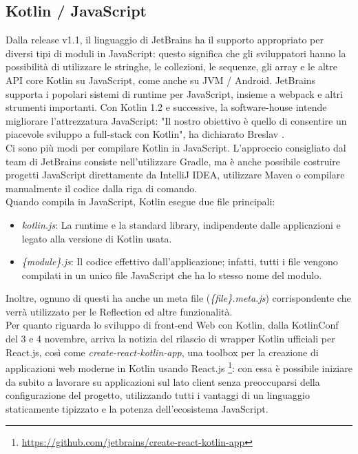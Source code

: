 \subsection{Kotlin / JavaScript}
Dalla release v1.1, il linguaggio di JetBrains ha il supporto appropriato per diversi tipi di moduli in JavaScript: questo significa che gli sviluppatori hanno la possibilità di utilizzare le stringhe, le collezioni, le sequenze, gli array e le altre API core Kotlin su JavaScript, come anche su JVM / Android. JetBrains supporta i popolari sistemi di runtime per JavaScript, insieme a webpack e altri strumenti importanti. Con Kotlin 1.2 e successive, la software-house intende migliorare l'attrezzatura JavaScript: "Il nostro obiettivo è quello di consentire un piacevole sviluppo a full-stack con Kotlin", ha dichiarato Breslav \cite{andreyBreslavInterview}.\\
Ci sono più modi per compilare Kotlin in JavaScript. L'approccio consigliato dal team di JetBrains consiste nell'utilizzare Gradle, ma è anche possibile costruire progetti JavaScript direttamente da IntelliJ IDEA, utilizzare Maven o compilare manualmente il codice dalla riga di comando.\\
Quando compila in JavaScript, Kotlin esegue due file principali:
\begin{itemize}
  \item {\em kotlin.js}: La runtime e la standard library, indipendente dalle applicazioni e legato alla versione di Kotlin   usata.
  \item {\em \{module\}.js}: Il codice effettivo dall'applicazione; infatti, tutti i file vengono compilati in un unico file JavaScript che ha lo stesso nome del modulo.
\end{itemize}
Inoltre, ognuno di questi ha anche un meta file ({\em \{file\}.meta.js}) corrispondente che verrà utilizzato per le Reflection ed altre funzionalità.\\
Per quanto riguarda lo sviluppo di front-end Web con Kotlin, dalla KotlinConf del 3 e 4 novembre, arriva la notizia del rilascio di wrapper Kotlin ufficiali per React.js, così come {\em create-react-kotlin-app}, una toolbox per la creazione di applicazioni web moderne in Kotlin usando React.js \footnote{\url{https://github.com/jetbrains/create-react-kotlin-app}}: con essa è possibile iniziare da subito a lavorare su applicazioni sul lato client senza preoccuparsi della configurazione del progetto, utilizzando tutti i vantaggi di un linguaggio staticamente tipizzato e la potenza dell'ecosistema JavaScript.\\

